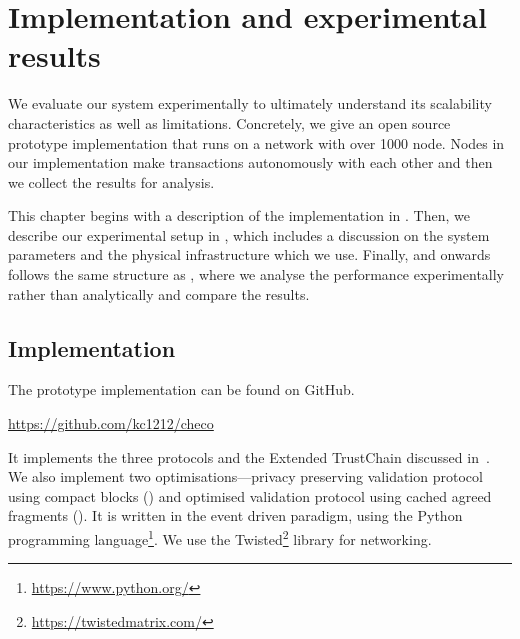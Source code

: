 \chapter{Implementation and experimental results}
\label{ch:implementation}

We evaluate our system experimentally to ultimately understand its scalability characteristics as well as limitations.
Concretely,
we give an open source prototype implementation that runs on a network with over 1000 node.
Nodes in our implementation make transactions autonomously with each other and then we collect the results for analysis.

This chapter begins with a description of the implementation in .
Then, we describe our experimental setup in ,
which includes a discussion on the system parameters and the physical infrastructure which we use.
Finally,  and onwards follows the same structure as ,
where we analyse the performance experimentally rather than analytically and compare the results.


\section{Implementation}
\label{sec:implementation}

The prototype implementation can be found on GitHub.
\begin{displayquote}
\url{https://github.com/kc1212/checo}
\end{displayquote}
It implements the three protocols and the Extended TrustChain discussed in~.
We also implement two optimisations---privacy preserving validation protocol using compact blocks ()
and optimised validation protocol using cached agreed fragments ().
It is written in the event driven paradigm, using the Python programming language\footnote{\url{https://www.python.org/}}.
We use the Twisted\footnote{\url{https://twistedmatrix.com/}} library for networking.

